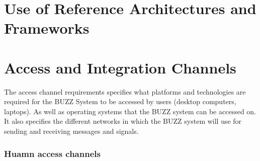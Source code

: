 \documentclass[a4paper]{article}
\begin{document}
\section{Use of Reference Architectures and Frameworks}

\section{Access and Integration Channels}
The access channel requirements specifies what platforms and technologies are required for the BUZZ System to be accessed by users (desktop computers, laptops). As well as operating systems that the BUZZ system can be accessed on. It also specifies the different networks in which the BUZZ system will use for sending and receiving messages and signals.

\subsubsection{Huamn access channels }
\end{document}
